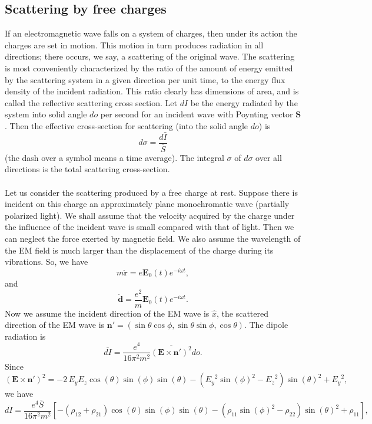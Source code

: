 \subsection{Scattering by free charges}
If an electromagnetic wave falls on a system of charges, then under its action the charges are set in motion. This motion in turn produces radiation in all directions; there occurs, we say, a scattering of the original wave. 
The scattering is most conveniently characterized by the ratio of the amount of energy emitted by the scattering system in a given direction per unit time, to the energy flux density of the incident radiation. This ratio clearly has dimensions of area, and is called the reflective
scattering cross section. 
Let $dI$ be the energy radiated by the system into solid angle $do$ per second for an incident wave with Poynting vector $\bm{S}$. Then the effective cross-section for scattering (into the solid angle $do$) is
\[d\sigma = \frac{d\bar{I}}{\bar{S}} \]
(the dash over a symbol means a time average). 
The integral $\sigma$ of $d\sigma$ over all directions is the total scattering cross-section.
\\ \\
Let us consider the scattering produced by a free charge at rest. Suppose there is incident on this charge an approximately plane monochromatic wave (partially polarized light). We shall assume that the velocity acquired by the charge under the influence of the incident wave is small compared with that of light. Then we can neglect the force exerted by magnetic field. We also assume the wavelength of the EM field is much larger than the displacement of the charge during its vibrations. 
So, we have
\[m\ddot{\bm{r}} = e\bm{E}_0(t) e^{-i\omega t},\]
and
\[\ddot{\bm{d}} = \frac{e^2}{m} \bm{E}_0(t) e^{-i\omega t}.\]
Now we assume the incident direction of the EM wave is $\hat{x}$, the scattered direction of the EM wave is $\bm{n}' =(\sin\theta\cos\phi,\sin\theta\sin\phi,\cos\theta)$. The dipole radiation is
\[\overline{dI} = \frac{e^4}{16\pi^2 m^2}\overline{(\bm{E}\times\bm{n}')^2} do.\]
Since
\[(\bm{E}\times\bm{n}')^2 = -2 \, {E_y} {E_z} \cos\left({\theta}\right) \sin\left({\phi}\right)
\sin\left({\theta}\right) - {\left({E_y}^{2} \sin\left({\phi}\right)^{2}
- {E_z}^{2}\right)} \sin\left({\theta}\right)^{2} + {E_y}^{2},\]
we have
\[\overline{dI} = \frac{e^4 \bar{S}}{16\pi^2 m^2}[-(\rho_{12}+\rho_{21})\cos\left({\theta}\right)\sin\left({\phi}\right)
\sin\left({\theta}\right) - {\left(\rho_{11} \sin\left({\phi}\right)^{2}
- \rho_{22}\right)} \sin\left({\theta}\right)^{2} + \rho_{11} ],\]
